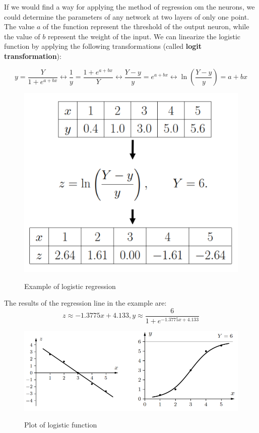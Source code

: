 \documentclass{article}
\begin{document}
If we would find a way for applying the method of regression om the neurons, we could
determine the parameters of any network at two layers of only one point. The value $a$
of the function represent the threshold of the output neuron, while the value of $b$
represent the weight of the input. We can linearize the logistic function by applying
the following transformations (called \textbf{logit transformation}):

$$y=\frac{Y}{1+e^{a+bx}}\longleftrightarrow\frac{1}{y} = \frac{1+e^{a+bx}}{Y}
    \longleftrightarrow\frac{Y-y}{y}=e^{a+bx}\longleftrightarrow\ln{\left(\frac{Y-y}{y}\right)}=a+bx$$
\begin{figure}[H]
    \centering
    \includegraphics[scale=0.5]{images/logistic_regre_1.png}
    \label{fig:regr_1}
    \caption{Example of logistic regression}
\end{figure}
The results of the regression line in the example are:
$$z\approx -1.3775x+4.133, y\approx\frac{6}{1+e^{-1.3775x+4.133}}$$

\begin{figure}[H]
    \centering
    \includegraphics[scale=0.5]{images/regression_line_2.png}
    \label{fig_regr_2}
    \caption{Plot of logistic function}
\end{figure}
\end{document}
